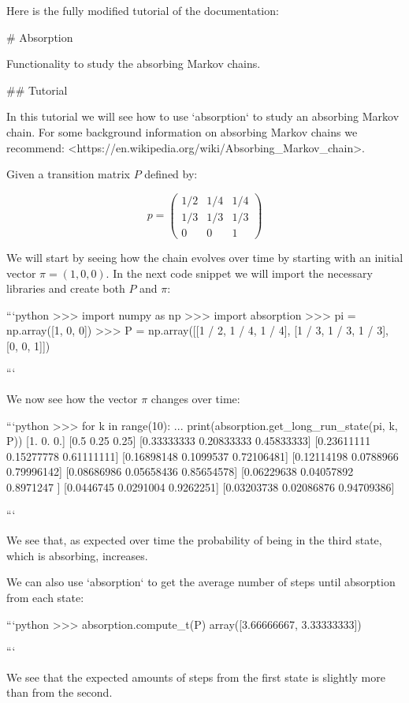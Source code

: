 Here is the fully modified tutorial of the documentation:

\begin{md}
# Absorption

Functionality to study the absorbing Markov chains.

## Tutorial

In this tutorial we will see how to use `absorption` to study an absorbing
Markov chain. For some background information on absorbing Markov chains we
recommend: <https://en.wikipedia.org/wiki/Absorbing_Markov_chain>.

Given a transition matrix $P$ defined by:

$$
p = \begin{pmatrix}
   1/2 & 1/4 & 1/4\\
   1/3 & 1/3 & 1/3\\
   0   & 0   & 1
    \end{pmatrix}
$$

We will start by seeing how the chain evolves over time by starting with an
initial vector $\pi=(1,0,0)$. In the next code snippet we will import the
necessary libraries and create both $P$ and $\pi$:

```python
>>> import numpy as np
>>> import absorption
>>> pi = np.array([1, 0, 0])
>>> P = np.array([[1 / 2, 1 / 4, 1 / 4], [1 / 3, 1 / 3, 1 / 3], [0, 0, 1]])

```

We now see how the vector $\pi$ changes over time:

```python
>>> for k in range(10):
...     print(absorption.get_long_run_state(pi, k, P))
[1. 0. 0.]
[0.5  0.25 0.25]
[0.33333333 0.20833333 0.45833333]
[0.23611111 0.15277778 0.61111111]
[0.16898148 0.1099537  0.72106481]
[0.12114198 0.0788966  0.79996142]
[0.08686986 0.05658436 0.85654578]
[0.06229638 0.04057892 0.8971247 ]
[0.0446745 0.0291004 0.9262251]
[0.03203738 0.02086876 0.94709386]

```

We see that, as expected over time the probability of being in the third state,
which is absorbing, increases.

We can also use `absorption` to get the average number of steps until
absorption from each state:

```python
>>> absorption.compute_t(P)
array([3.66666667, 3.33333333])

```

We see that the expected amounts of steps from the first state is slightly more
than from the second.
\end{md}

